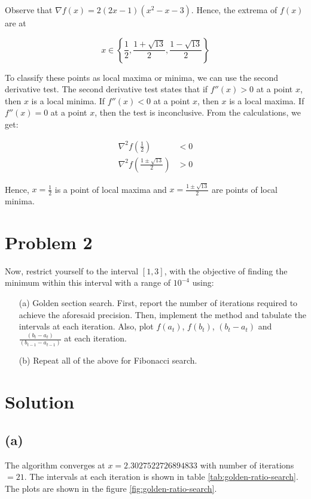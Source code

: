\documentclass{article}
\begin{document}
Observe that $\nabla f(x) = 2(2x - 1)(x^2 - x - 3)$. Hence, the extrema of $f(x)$ are at 

$$x \in \left\{\frac{1}{2}, \frac{1 + \sqrt{13}}{2}, \frac{1 - \sqrt{13}}{2}\right\}$$

To classify these points as local maxima or minima, we can use the second derivative test. The second derivative test states that if $f''(x) > 0$ at a point $x$, then $x$ is a local minima. If $f''(x) < 0$ at a point $x$, then $x$ is a local maxima. If $f''(x) = 0$ at a point $x$, then the test is inconclusive. From the calculations, we get:

\begin{align*}
    \nabla^2 f\left(\frac{1}{2}\right) &< 0 \\
    \nabla^2 f\left(\frac{1 \pm \sqrt{13}}{2}\right) &> 0 
\end{align*}

Hence, $x = \frac{1}{2}$ is a point of local maxima and $x = \frac{1 \pm \sqrt{13}}{2}$ are points of local minima.

\section*{Problem 2}

Now, restrict yourself to the interval $[1, 3]$, with the objective of finding the minimum within this interval with a range of $10^{-4}$ using:

\begin{enumerate}
    \item [(a)] Golden section search. First, report the number of iterations required to achieve the aforesaid precision. Then, implement the method and tabulate the intervals at each iteration. Also, plot $f(a_t)$, $f(b_t)$, $(b_t - a_t)$ and $\frac{(b_t - a_t)}{(b_{t - 1} - a_{t - 1})}$ at each iteration.
    \item [(b)] Repeat all of the above for Fibonacci search.
\end{enumerate}

\section*{Solution}

\subsection*{(a)}

The algorithm converges at $x = 2.3027522726894833$ with number of iterations $= 21$. The intervals at each iteration is shown in table \ref{tab:golden-ratio-search}. The plots are shown in the figure \ref{fig:golden-ratio-search}.
\end{document}
